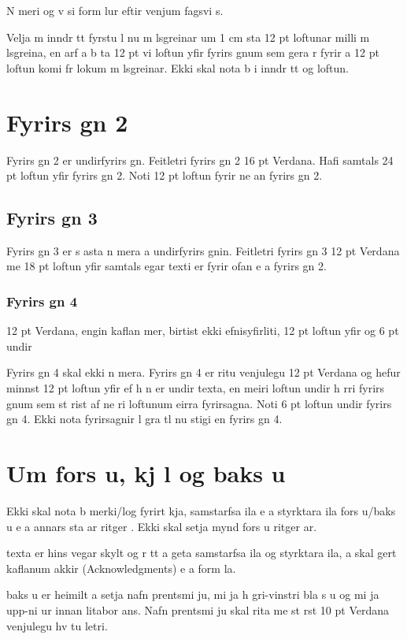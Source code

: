 \documentclass{article}
\begin{document}
N meri  og v si    form lur eftir venjum fagsvi s.

Velja m  inndr tt fyrstu l nu m lsgreinar um 1 cm   sta  12 pt loftunar   milli m lsgreina, en    arf a  b ta 12 pt vi  loftun yfir fyrirs gnum sem gera r  fyrir a  12 pt loftun komi fr  lokum m lsgreinar. Ekki skal nota b i inndr tt og loftun.

\section{Fyrirs gn 2}
Fyrirs gn 2 er undirfyrirs gn. Feitletri  fyrirs gn 2   16 pt Verdana. Hafi  samtals 24 pt loftun yfir fyrirs gn 2. Noti  12 pt loftun fyrir ne an fyrirs gn 2.

\subsection{Fyrirs gn 3}
Fyrirs gn 3 er s asta n mera a undirfyrirs gnin. Feitletri  fyrirs gn 3   12 pt Verdana me  18 pt loftun yfir samtals  egar texti er fyrir ofan e a fyrirs gn 2. 
\subsubsection{Fyrirs gn 4}
12 pt Verdana, engin kaflan mer, birtist ekki   efnisyfirliti, 12 pt loftun yfir og 6 pt undir

Fyrirs gn 4 skal ekki n mera. Fyrirs gn 4 er ritu    venjulegu 12 pt Verdana og hefur minnst 12 pt loftun yfir ef h n er undir texta, en meiri loftun undir h rri fyrirs gnum sem st rist af ne ri loftunum  eirra fyrirsagna. Noti  6 pt loftun undir fyrirs gn 4.
Ekki nota fyrirsagnir   l gra  tl nu stigi en fyrirs gn 4.

\section{Um fors u, kj l og baks u}
Ekki skal nota b merki/log  fyrirt kja, samstarfsa ila e a styrktara ila   fors u/baks u e a annars sta ar   ritger . Ekki skal setja mynd   fors u ritger ar. 

  texta er hins vegar skylt og r tt a  geta samstarfsa ila og styrktara ila,  a  skal gert   kaflanum  akkir (Acknowledgments) e a   form la.

  baks u er heimilt a  setja nafn prentsmi ju,   mi ja  h gri-vinstri   bla s u og mi ja  upp-ni ur innan litabor ans. Nafn prentsmi ju skal rita  me  st rst 10 pt Verdana   venjulegu hv tu letri.
\end{document}
